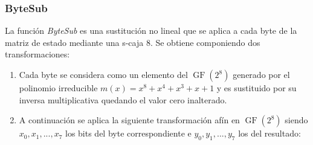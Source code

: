 	\subsubsection{ByteSub}
		La función \emph{ByteSub} es una sustitución no lineal que se aplica a cada byte de la matriz de estado mediante una s-caja 8. Se obtiene componiendo dos transformaciones:
		\begin{enumerate}
			\item Cada byte se considera como un elemento del $\operatorname{GF}(2^8)$ generado por el polinomio irreducible $m(x)=x^8+x^4+x^3+x+1$ y es sustituido por su inversa multiplicativa quedando el valor cero inalterado. 
			\item A continuación se aplica la siguiente transformación afín en $\operatorname{GF}(2^8)$ siendo $x_0, x_1,...,x_7$ los bits del byte correspondiente e $y_0, y_1,...,y_7$ los del resultado:


\end{enumerate}
